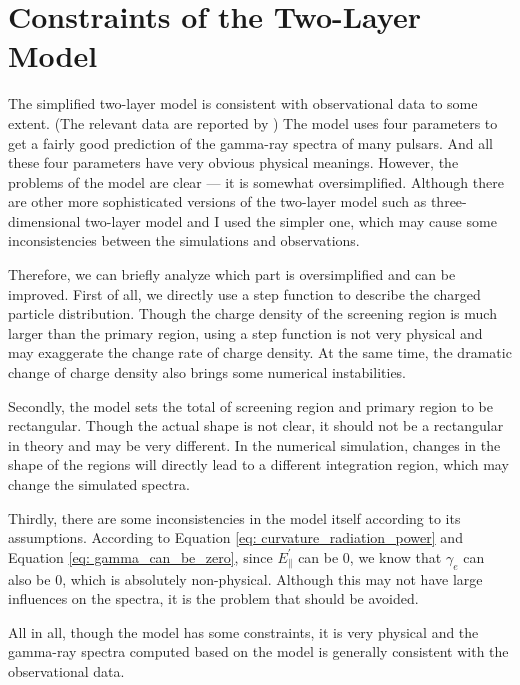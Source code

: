 \documentclass[a4paper, 12pt]{report}
\begin{document}
  \section{Constraints of the Two-Layer Model} 
    The simplified two-layer model is consistent with observational data to some extent. 
    (The relevant data are reported by \citet{0004-637X-720-1-178})
    The model uses four parameters to get a fairly good prediction of the gamma-ray 
    spectra of many pulsars. And all these four parameters have very obvious physical 
    meanings. However, the problems of the model are clear --- it is somewhat 
    oversimplified. Although there are other more sophisticated versions of the 
    two-layer model such as three-dimensional two-layer model 
    \citep{doi:10.1111/j.1365-2966.2011.18577.x} and I used the simpler 
    one, which may cause some inconsistencies between the simulations and observations. 

    Therefore, we can briefly analyze which part is oversimplified and can be improved. 
    First of all, we directly use a step function to describe the charged particle 
    distribution. Though the charge density of the screening region is much larger than 
    the primary region, using a step function is not very physical and may exaggerate 
    the change rate of charge density. At the same time, the dramatic change of charge 
    density also brings some numerical instabilities.

    Secondly, the model sets the total of screening region and primary region to be 
    rectangular. Though the actual shape is not clear, it should not be a 
    rectangular in theory and may be very different. In the numerical simulation, changes 
    in the shape of the regions will directly lead to a different integration region, 
    which may change the simulated spectra.
  
    Thirdly, there are some inconsistencies in the model itself according to its 
    assumptions. According to Equation \ref{eq: curvature_radiation_power} and Equation 
    \ref{eq: gamma_can_be_zero}, since $E_{\parallel}^{\prime}$ can be $0$, we know that 
    $\gamma_{e}$ can also be $0$, which is absolutely non-physical. Although this may not 
    have large influences on the spectra, it is the problem that should be avoided.

    All in all, though the model has some constraints, it is very physical and the gamma-ray 
    spectra computed based on the model is generally consistent with the observational data.
\end{document}
